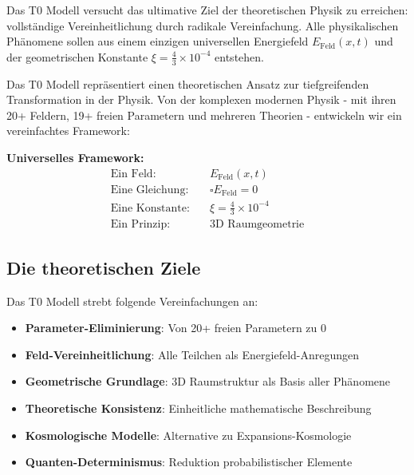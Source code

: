 \documentclass[12pt,a4paper]{report}
\newcommand{\xikonst}{\xi = \frac{4}{3} \times 10^{-4}}
\begin{document}
	\begin{revolutionaer}
		Das T0 Modell versucht das ultimative Ziel der theoretischen Physik zu erreichen: vollständige Vereinheitlichung durch radikale Vereinfachung. Alle physikalischen Phänomene sollen aus einem einzigen universellen Energiefeld $E_{\text{Feld}}(x,t)$ und der geometrischen Konstante $\xikonst$ entstehen.
	\end{revolutionaer}
	
	Das T0 Modell repräsentiert einen theoretischen Ansatz zur tiefgreifenden Transformation in der Physik. Von der komplexen modernen Physik - mit ihren 20+ Feldern, 19+ freien Parametern und mehreren Theorien - entwickeln wir ein vereinfachtes Framework:
	
	\begin{formel}
		\textbf{Universelles Framework:}
		\begin{align}
			\text{Ein Feld:} \quad &E_{\text{Feld}}(x,t) \\
			\text{Eine Gleichung:} \quad &\square E_{\text{Feld}} = 0 \\
			\text{Eine Konstante:} \quad &\xi = \frac{4}{3} \times 10^{-4} \\
			\text{Ein Prinzip:} \quad &\text{3D Raumgeometrie}
		\end{align}
	\end{formel}
	
	\subsection{Die theoretischen Ziele}
	
	Das T0 Modell strebt folgende Vereinfachungen an:
	
	\begin{itemize}
		\item \textbf{Parameter-Eliminierung}: Von 20+ freien Parametern zu 0
		\item \textbf{Feld-Vereinheitlichung}: Alle Teilchen als Energiefeld-Anregungen
		\item \textbf{Geometrische Grundlage}: 3D Raumstruktur als Basis aller Phänomene
		\item \textbf{Theoretische Konsistenz}: Einheitliche mathematische Beschreibung
		\item \textbf{Kosmologische Modelle}: Alternative zu Expansions-Kosmologie
		\item \textbf{Quanten-Determinismus}: Reduktion probabilistischer Elemente
	\end{itemize}
	
\end{document}
